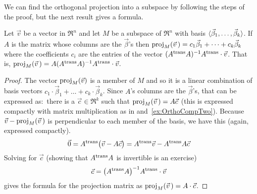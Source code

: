We can find the orthogonal projection into a subspace by 
following the steps of the proof, but the next result gives a 
formula.

\begin{theorem} \label{th:OrthProjMat}
Let $\vec{v}$ be a vector in $\Re^n$ and 
let \( M \) be a subspace of \( \Re^n \) with basis
\( \sequence{\vec{\beta}_1,\dots,\vec{\beta}_k} \). 
If \( A \) is the matrix whose columns are the \( \vec{\beta} \)'s
then $\proj{\vec{v}\,}{M}=c_1\vec{\beta}_1+\dots+c_k\vec{\beta}_k$
where the coefficients $c_i$ are the entries of the vector
$(\trans{A}A)^{-1}\trans{A}\cdot\vec{v}$.
That is, 
$\proj{\vec{v}\,}{M}=A(\trans{A}A)^{-1}\trans{A}\cdot\vec{v}$.
\end{theorem}

\begin{proof}
The vector \( \proj{\vec{v}}{M} \) is a member of \( M \) and so it is a
linear combination of basis vectors
\( c_1\cdot\vec{\beta}_1+\dots+c_k\cdot\vec{\beta}_k \).
Since $A$'s columns are the $\vec{\beta}$'s, that can be expressed 
as:~there is a \( \vec{c}\in\Re^k \) such that
\( \proj{\vec{v}\,}{M}=A\vec{c} \)
(this is expressed compactly with matrix
multiplication as in
 and~\ref{ex:OrthoCompTwo}).
Because \( \vec{v}-\proj{\vec{v}\,}{M} \) is perpendicular to each member
of the basis, we have this (again, expressed compactly).
\begin{equation*}
  \zero
  =\trans{A}\bigl( \vec{v}-A\vec{c} \bigr) 
  =\trans{A}\vec{v}-\trans{A}A\vec{c}
\end{equation*}
Solving for \( \vec{c} \) (showing that \( \trans{A}A \) is invertible is an
exercise)
\begin{equation*}
  \vec{c}=\bigl( \trans{A}A\bigr)^{-1}\trans{A}\cdot\vec{v}
\end{equation*}
gives the formula for the projection matrix as 
$\proj{\vec{v}\,}{M}=A\cdot\vec{c}$.
\end{proof}

